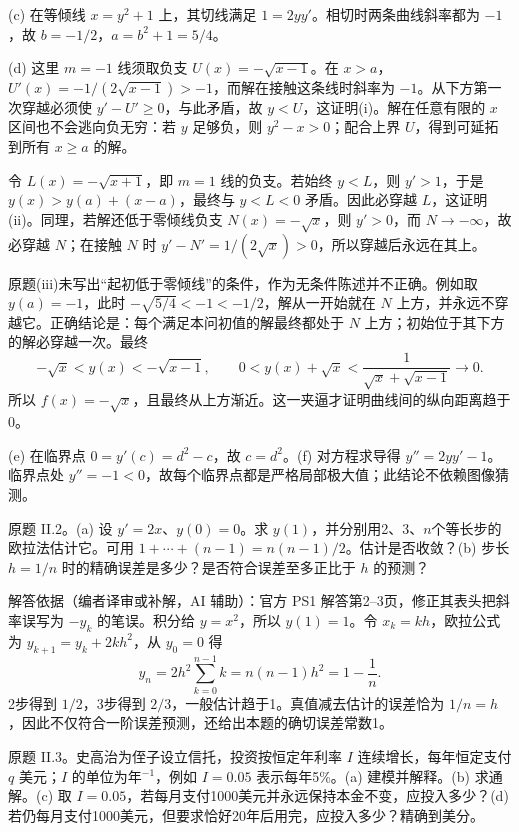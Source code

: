 \begin{solution}
\begin{center}
\end{center}

(c) 在等倾线 $x=y^2+1$ 上，其切线满足 $1=2yy'$。相切时两条曲线斜率都为 $-1$，故 $b=-1/2$，$a=b^2+1=5/4$。

(d) 这里 $m=-1$ 线须取负支 $U(x)=-\sqrt{x-1}$。在 $x>a$，$U'(x)=-1/(2\sqrt{x-1})>-1$，而解在接触这条线时斜率为 $-1$。从下方第一次穿越必须使 $y'-U'\geq0$，与此矛盾，故 $y<U$，这证明(i)。解在任意有限的 $x$ 区间也不会逃向负无穷：若 $y$ 足够负，则 $y^2-x>0$；配合上界 $U$，得到可延拓到所有 $x\geq a$ 的解。

令 $L(x)=-\sqrt{x+1}$，即 $m=1$ 线的负支。若始终 $y<L$，则 $y'>1$，于是 $y(x)>y(a)+(x-a)$，最终与 $y<L<0$ 矛盾。因此必穿越 $L$，这证明(ii)。同理，若解还低于零倾线负支 $N(x)=-\sqrt x$，则 $y'>0$，而 $N\to-\infty$，故必穿越 $N$；在接触 $N$ 时 $y'-N'=1/(2\sqrt x)>0$，所以穿越后永远在其上。

原题(iii)未写出“起初低于零倾线”的条件，作为无条件陈述并不正确。例如取 $y(a)=-1$，此时 $-\sqrt{5/4}<-1<-1/2$，解从一开始就在 $N$ 上方，并永远不穿越它。正确结论是：每个满足本问初值的解最终都处于 $N$ 上方；初始位于其下方的解必穿越一次。最终
\[
 -\sqrt x<y(x)<-\sqrt{x-1},\qquad
 0<y(x)+\sqrt x<\frac1{\sqrt x+\sqrt{x-1}}\longrightarrow0.
\]
所以 $f(x)=-\sqrt x$，且最终从上方渐近。这一夹逼才证明曲线间的纵向距离趋于0。

(e) 在临界点 $0=y'(c)=d^2-c$，故 $c=d^2$。(f) 对方程求导得 $y''=2yy'-1$。临界点处 $y''=-1<0$，故每个临界点都是严格局部极大值；此结论不依赖图像猜测。
\end{solution}
\begin{exercise}\label{cw:ps1-II-2}
原题 II.2。(a) 设 $y'=2x$、$y(0)=0$。求 $y(1)$，并分别用2、3、$n$个等长步的欧拉法估计它。可用 $1+\cdots+(n-1)=n(n-1)/2$。估计是否收敛？(b) 步长 $h=1/n$ 时的精确误差是多少？是否符合误差至多正比于 $h$ 的预测？
\end{exercise}
\begin{solution}
解答依据（编者译审或补解，AI 辅助）：官方 PS1 解答第2--3页，修正其表头把斜率误写为 $-y_k$ 的笔误。积分给 $y=x^2$，所以 $y(1)=1$。令 $x_k=kh$，欧拉公式为 $y_{k+1}=y_k+2kh^2$，从 $y_0=0$ 得
\[
 y_n=2h^2\sum_{k=0}^{n-1}k=n(n-1)h^2=1-\frac1n.
\]
2步得到 $1/2$，3步得到 $2/3$，一般估计趋于1。真值减去估计的误差恰为 $1/n=h$，因此不仅符合一阶误差预测，还给出本题的确切误差常数1。
\end{solution}
\begin{exercise}\label{cw:ps1-II-3}
原题 II.3。史高治为侄子设立信托，投资按恒定年利率 $I$ 连续增长，每年恒定支付 $q$ 美元；$I$ 的单位为年$^{-1}$，例如 $I=0.05$ 表示每年5\%。(a) 建模并解释。(b) 求通解。(c) 取 $I=0.05$，若每月支付1000美元并永远保持本金不变，应投入多少？(d) 若仍每月支付1000美元，但要求恰好20年后用完，应投入多少？精确到美分。
\end{exercise}
